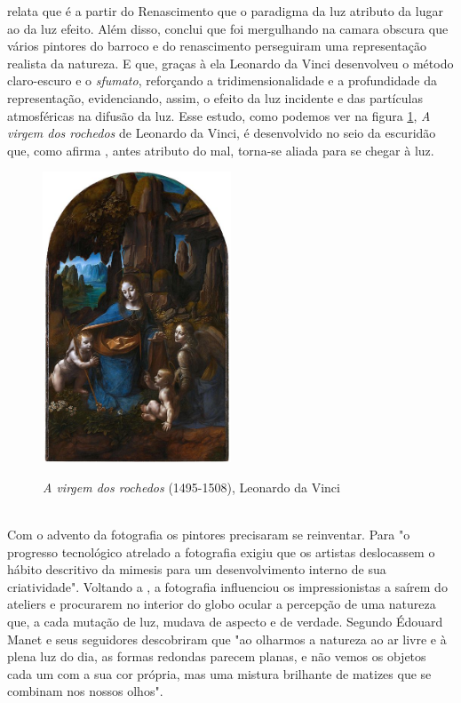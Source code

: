  relata que é a partir do Renascimento que o paradigma da luz atributo da lugar ao da luz efeito. Além disso, conclui que foi mergulhando na camara obscura que vários pintores do barroco e do renascimento perseguiram uma representação realista da natureza. E que, graças à ela Leonardo da Vinci desenvolveu o método claro-escuro e o \textit{sfumato}, reforçando a tridimensionalidade e a profundidade da representação, evidenciando, assim, o efeito da luz incidente e das partículas atmosféricas na difusão da luz. Esse estudo,  como podemos ver na figura \ref{fig:da_vinci_virgem_rochedos}, \textit{A virgem dos rochedos} de Leonardo da Vinci, é desenvolvido no seio da escuridão que, como afirma , antes atributo do mal, torna-se aliada para se chegar à luz.

\begin{figure}[H]
    \centering
    \caption{\textit{A virgem dos rochedos} (1495-1508), Leonardo da Vinci}
	\vspace*{0,2cm}
    \includegraphics[width=0.5\textwidth]{./04-figuras/da_vinci_virgem_rochedos}
    \label{fig:da_vinci_virgem_rochedos}
\end{figure}
\vspace*{-0,9cm}
{\raggedright {}}\\


Com o advento da fotografia os pintores precisaram se reinventar. Para  "o progresso tecnológico atrelado a fotografia exigiu que os artistas deslocassem o hábito descritivo da mimesis para um desenvolvimento interno de sua criatividade". Voltando a , a fotografia influenciou os impressionistas a saírem do ateliers e procurarem no interior do globo ocular a percepção de uma natureza que, a cada mutação de luz, mudava de aspecto e de verdade. Segundo  Édouard Manet e seus seguidores descobriram que "ao olharmos a natureza ao ar livre e à plena luz do dia, as formas redondas parecem planas, e não vemos os objetos cada um com a sua cor própria, mas uma mistura brilhante de matizes que se combinam nos nossos olhos".


